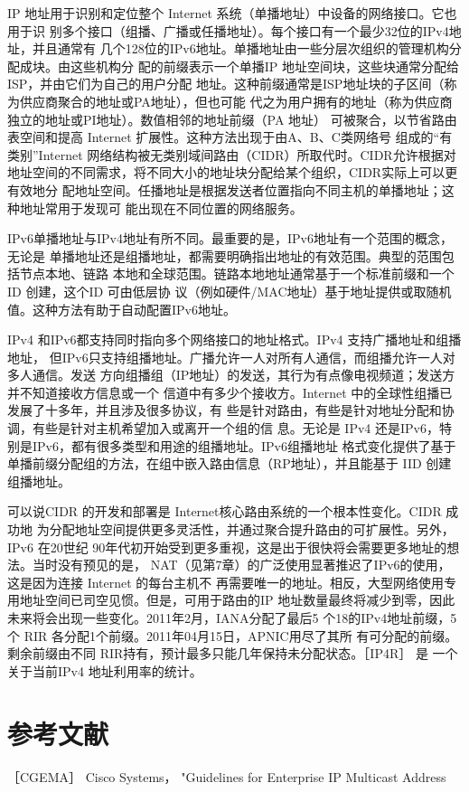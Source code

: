 IP 地址用于识别和定位整个 Internet 系统（单播地址）中设备的网络接口。它也用于识
别多个接口（组播、广播或任播地址）。每个接口有一个最少32位的IPv4地址，并且通常有
几个128位的IPv6地址。单播地址由一些分层次组织的管理机构分配成块。由这些机构分
配的前缀表示一个单播IP 地址空间块，这些块通常分配给ISP，并由它们为自己的用户分配
地址。这种前缀通常是ISP地址块的子区间（称为供应商聚合的地址或PA地址），但也可能
代之为用户拥有的地址（称为供应商独立的地址或PI地址）。数值相邻的地址前缀（PA 地址）
可被聚合，以节省路由表空间和提高 Internet 扩展性。这种方法出现于由A、B、C类网络号
组成的“有类别”Internet 网络结构被无类别域间路由（CIDR）所取代时。CIDR允许根据对
地址空间的不同需求，将不同大小的地址块分配给某个组织，CIDR实际上可以更有效地分
配地址空间。任播地址是根据发送者位置指向不同主机的单播地址；这种地址常用于发现可
能出现在不同位置的网络服务。

IPv6单播地址与IPv4地址有所不同。最重要的是，IPv6地址有一个范围的概念，无论是
单播地址还是组播地址，都需要明确指出地址的有效范围。典型的范围包括节点本地、链路
本地和全球范围。链路本地地址通常基于一个标准前缀和一个ID 创建，这个ID 可由低层协
议（例如硬件/MAC地址）基于地址提供或取随机值。这种方法有助于自动配置IPv6地址。

IPv4 和IPv6都支持同时指向多个网络接口的地址格式。IPv4 支持广播地址和组播地址，
但IPv6只支持组播地址。广播允许一人对所有人通信，而组播允许一人对多人通信。发送
方向组播组（IP地址）的发送，其行为有点像电视频道；发送方并不知道接收方信息或一个
信道中有多少个接收方。Internet 中的全球性组播已发展了十多年，并且涉及很多协议，有
些是针对路由，有些是针对地址分配和协调，有些是针对主机希望加入或离开一个组的信
息。无论是 IPv4 还是IPv6，特别是IPv6，都有很多类型和用途的组播地址。IPv6组播地址
格式变化提供了基于单播前缀分配组的方法，在组中嵌入路由信息（RP地址），并且能基于
IID 创建组播地址。

可以说CIDR 的开发和部署是 Internet核心路由系统的一个根本性变化。CIDR 成功地
为分配地址空间提供更多灵活性，并通过聚合提升路由的可扩展性。另外，IPv6 在20世纪
90年代初开始受到更多重视，这是出于很快将会需要更多地址的想法。当时没有预见的是，
NAT（见第7章）的广泛使用显著推迟了IPv6的使用，这是因为连接 Internet 的每台主机不
再需要唯一的地址。相反，大型网络使用专用地址空间已司空见惯。但是，可用于路由的IP
地址数量最终将减少到零，因此未来将会出现一些变化。2011年2月，IANA分配了最后5
个18的IPv4地址前缀，5个 RIR 各分配1个前缀。2011年04月15日，APNIC用尽了其所
有可分配的前缀。剩余前缀由不同 RIR持有，预计最多只能几年保持未分配状态。［IP4R］ 是
一个关于当前IPv4 地址利用率的统计。

\section{参考文献}
［CGEMA］ Cisco Systems， "Guidelines for Enterprise IP Multicast Address

